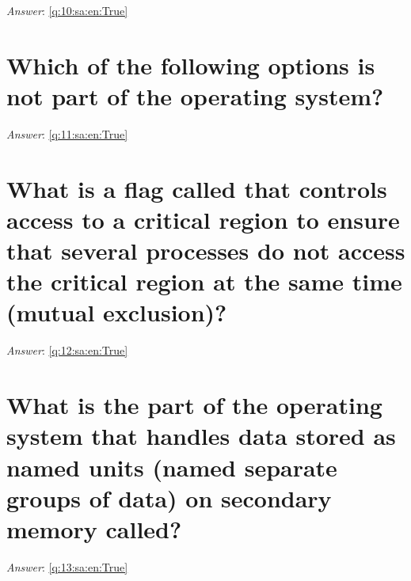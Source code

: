 \documentclass[a4paper,11pt,oneside]{book}
\begin{document}
\begin{sloppypar}
\vspace{1cm}

\textit{Answer}: \autoref{q:10:sa:en:True}



\section{Which of the following options is not part of the operating system?}

\label{q:11:sa:en:False}

\vspace{2cm}

\noindent\makebox[\textwidth]{\hrulefill}

\vspace{1cm}

\textit{Answer}: \autoref{q:11:sa:en:True}



\section{What is a flag called that controls access to a critical region to ensure that several processes do not access the critical region at the same time (mutual exclusion)?}

\label{q:12:sa:en:False}

\vspace{2cm}

\noindent\makebox[\textwidth]{\hrulefill}

\vspace{1cm}

\textit{Answer}: \autoref{q:12:sa:en:True}



\section{What is the part of the operating system that handles data stored as named units (named separate groups of data) on secondary memory called?}

\label{q:13:sa:en:False}

\vspace{2cm}

\noindent\makebox[\textwidth]{\hrulefill}

\vspace{1cm}

\textit{Answer}: \autoref{q:13:sa:en:True}




\end{sloppypar}
\end{document}
